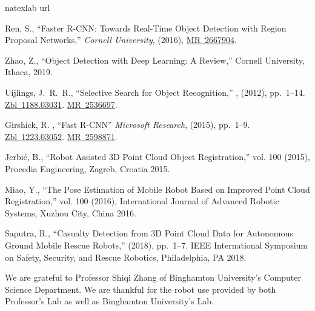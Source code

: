 \documentclass{ndjflart}
\theoremstyle{definition}
\theoremstyle{remark}
\begin{document}
\begin{thebibliography}{5}
\expandafter\ifx\csname natexlab\endcsname\relax\def\natexlab#1{#1}\fi
\def\docolon{:}
\def\eatcomma#1{}
\def\onlyone#1{\gdef\oneletter{#1}}
\def\sphref#1#2{{\let\#=\docolon\xdef\one{#1}}\href{\one}{#2}}
\def\zhref#1,#2{{\let\#=\docolon\xdef\one{#1}}\href{\one}{#2}}
\expandafter\ifx\csname url\endcsname\relax
  \def\url#1{{\tt #1}}\fi
\newcommand{\enquote}[2]{``#1,''}

Ren, S.,
\newblock \enquote{Faster R-CNN: Towards Real-Time Object Detection with Region Proposal Networks}, {\em Cornell University}, (2016),
  \sphref{https://arxiv.org/abs/1506.01497}{\hbox{MR 2667904}}.

Zhao, Z.,
\newblock \enquote{Object Detection with Deep Learning: A Review},
\newblock Cornell University, Ithaca, 2019.

Uijlings, J.~R.~R.,
\newblock \enquote{Selective Search for Object Recognition},
, (2012),
  pp.~1--14.\eatcomma. \zhref{https://ivi.fnwi.uva.nl/isis/publications/2013/UijlingsIJCV2013/UijlingsIJCV2013.pdf},
  {\hbox{Zbl 1188.03031}}.
  \sphref{http://www.ams.org/mathscinet-getitem?mr=2536697}{\hbox{MR 2536697}}.

Girshick, R. \unskip,
``Fast R-CNN''
{\em Microsoft Research}, (2015),
  pp.~1--9.\eatcomma.
  \zhref{https://arxiv.org/pdf/1504.08083.pdf}, {\hbox{Zbl
  1223.03052}}.
  \sphref{http://www.ams.org/mathscinet-getitem?mr=2598871}{\hbox{MR 2598871}}.

 Jerbić, B.,
\newblock \enquote{Robot Assisted 3D Point Cloud Object Registration}, vol. 100 (2015),
\newblock Procedia Engineering, Zagreb, Croatia 2015.

 Miao, Y.,
\newblock \enquote{The Pose Estimation of Mobile Robot Based on Improved Point Cloud Registration}, vol. 100 (2016),
\newblock International Journal of Advanced Robotic Systems, Xuzhou City, China 2016.

 Saputra, R.,
\newblock \enquote{Casualty Detection from 3D Point Cloud Data for Autonomous Ground Mobile Rescue Robots}, (2018), pp.~1--7.
\newblock IEEE International Symposium on Safety, Security, and Rescue Robotics, Philadelphia, PA 2018.

\end{thebibliography}


% 
%

\begin{acks}
  We are grateful to Professor Shiqi Zhang of Binghamton University’s Computer Science Department. We are thankful for the robot use provided by both Professor’s Lab as well as Binghamton University’s Lab.

\end{acks}
\end{document}
